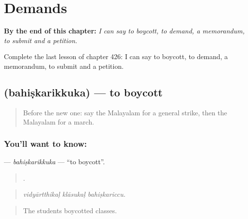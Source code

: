 
\chapter{Demands}
\label{ch:ml-demands}

\begin{chapteropening}
\textbf{By the end of this chapter:} \emph{I can say to boycott, to demand, a memorandum, to submit and a petition.}

Complete the last lesson of chapter 426: I can say to boycott, to demand, a memorandum, to submit and a petition.
\end{chapteropening}

\section[\texorpdfstring{\ml{ബഹിഷ്കരിക്കുക} (bahiṣkarikkuka)}{ബഹിഷ്കരിക്കുക (bahiṣkarikkuka)}]{ (bahiṣkarikkuka) — to boycott}

\label{lesson:ML-C426-bahiskarikkuka}



\begin{quote}
Before the new one: say the Malayalam for a general strike, then the Malayalam for a march.
\end{quote}

\subsection*{You'll want to know: }
\textbf{} — \emph{bahiṣkarikkuka} — \textquotedblleft{}to boycott\textquotedblright{}.

\begin{quote}
  .
\end{quote}

\begin{quote}
\emph{vidyārtthikaḷ klāsukaḷ bahiṣkariccu.}
\end{quote}

\begin{quote}
The students boycotted classes.
\end{quote}

